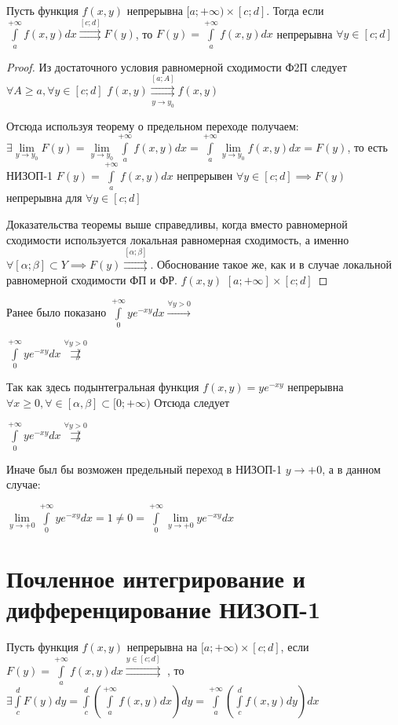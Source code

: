 \documentclass[../../main.tex]{subfiles}
\begin{document}
\begin{crl*}
Пусть функция $f(x,y)$ непрерывна $[a;+\infty) \times [ c; d]$. Тогда если 
$\int\limits_a^{+\infty}f(x,y)dx \overset{[c;d]}\rightrightarrows F(y)$, то
$ F(y) = \int\limits_a^{+\infty}f(x,y)dx$ непрерывна $\forall y \in [c;d]$
\end{crl*}

\begin{proof}
Из достаточного условия равномерной сходимости Ф2П следует $\forall A \ge a, 
\forall y \in [c;d] $ $f(x,y) \overset{[a;A]}{\underset{y \to 
y_0}{\rightrightarrows}} f(x,y) $

Отсюда используя теорему о предельном переходе получаем:$\exists \underset{y 
\to y_0}{\lim} F(y) = \underset{y \to y_0}\lim \int\limits_a^{+\infty}f(x,y)dx 
= \int\limits_a^{+\infty}\underset{y \to y_0}\lim f(x,y)dx = F(y) $, то есть 
НИЗОП-1 $F(y) = \int\limits_a^{+\infty}f(x,y)dx $ непрерывен $ \forall y \in 
[c;d] \implies F(y) $непрерывна для $ \forall y \in [c;d]$

Доказательства теоремы выше справедливы, когда вместо равномерной сходимости 
используется локальная равномерная сходимость, а именно$\forall [\alpha;\beta] 
\subset Y \implies F(y) \overset{[\alpha;\beta]}{\rightrightarrows}$. 
Обоснование такое же, как и в случае локальной равномерной сходимости ФП и ФР.
$f(x,y)$ $[a;+\infty]\times[c;d]$
\end{proof}

\begin{exmp}
Ранее было показано
$\int\limits_0^{+\infty}ye^{-xy}dx \xrightarrow{\forall y > 0}$

$\int\limits_0^{+\infty}ye^{-xy}dx \overset{\forall y > 
0}{\not\rightrightarrows}$

Так как здесь подынтегральная функция $f(x,y) = ye^{-xy}$ непрерывна $\forall 
x \ge 0, \forall \in [\alpha,\beta] \subset [0;+\infty)$ 
Отсюда следует

$\int\limits_0^{+\infty}ye^{-xy}dx \overset{\forall y > 
0}{\not\rightrightarrows}$

Иначе был бы возможен предельный переход в НИЗОП-1 $y \to +0 $, а в данном 
случае:

$\underset{y \to +0}\lim\int\limits_0^{+\infty}ye^{-xy}dx = 1 \ne 0 = 
\int\limits_0^{+\infty}\underset{y \to +0}\lim ye^{-xy}dx$
\end{exmp}

\section{Почленное интегрирование и дифференцирование НИЗОП-1}

\begin{thm}
Пусть функция $f(x,y)$ непрерывна на $[a;+\infty)\times [c;d]$, если $F(y) = 
\int\limits_a^{+\infty}f(x,y)dx \overset{y \in [c;d]}{\rightrightarrows}$ , то 
  $\exists \int\limits_c^d F(y)dy =\int\limits_c^d\left( 
\int\limits_a^{+\infty}f(x,y)dx\right) dy = 
\int\limits_a^{+\infty}\left(\int\limits_c^d f(x,y)dy\right)dx $
\end{thm}
\end{document}
